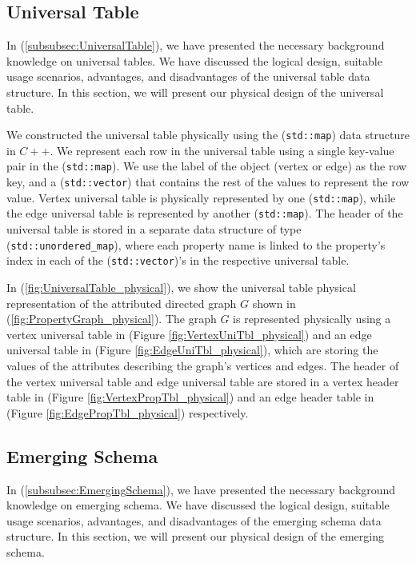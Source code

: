 {\subsection{Universal Table}
\label{subsec:PhyDesign-UniversalTable}

In (\ref{subsubsec:UniversalTable}), we have presented the necessary background knowledge on universal tables. We have discussed the logical design, suitable usage scenarios, advantages, and disadvantages of the universal table data structure. In this section, we will present our physical design of the universal table.

We constructed the universal table physically using the (\texttt{std::map}) data structure in $C++$. We represent each row in the universal table using a single key-value pair in the (\texttt{std::map}).  We use the label of the object (vertex or edge) as the row key, and a (\texttt{std::vector}) that contains the rest of the values to represent the row value. Vertex universal table is physically represented by one (\texttt{std::map}), while the edge universal table is represented by another (\texttt{std::map}). The header of the universal table is stored in a separate data structure of type (\texttt{std::unordered\_map}), where each property name is linked to the property's index in each of the (\texttt{std::vector})'s in the respective universal table.

In (\ref{fig:UniversalTable_physical}), we show the universal table physical representation of the attributed directed graph $G$ shown in (\ref{fig:PropertyGraph_physical}). The graph $G$ is represented physically using a vertex universal table in (Figure \ref{fig:VertexUniTbl_physical}) and an edge universal table in (Figure \ref{fig:EdgeUniTbl_physical}), which are storing the values of the attributes describing the graph's vertices and edges. The header of the vertex universal table and edge universal table are stored in a vertex header table in (Figure \ref{fig:VertexPropTbl_physical}) and an edge header table in (Figure \ref{fig:EdgePropTbl_physical}) respectively. 


\subsection{Emerging Schema}
\label{subsec:PhyDesign-EmergingSchema}

In (\ref{subsubsec:EmergingSchema}), we have presented the necessary background knowledge on emerging schema. We have discussed the logical design, suitable usage scenarios, advantages, and disadvantages of the emerging schema data structure. In this section, we will present  our physical design of the emerging schema.

}
